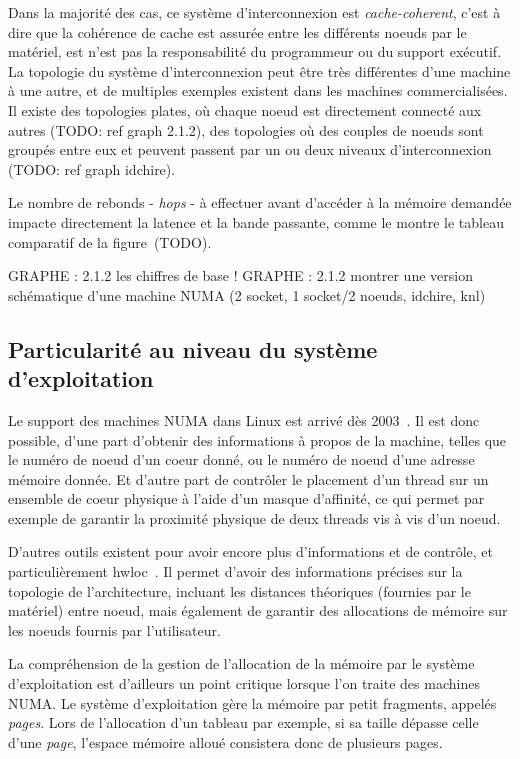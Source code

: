 Dans la majorité des cas, ce système d'interconnexion est \emph{cache-coherent}, c'est à dire que la cohérence de cache est assurée entre les différents noeuds par le matériel, est n'est pas la responsabilité du programmeur ou du support exécutif.
La topologie du système d'interconnexion peut être très différentes d'une machine à une autre, et de multiples exemples existent dans les machines commercialisées.
Il existe des topologies plates, où chaque noeud est directement connecté aux autres (TODO: ref graph 2.1.2), des topologies où des couples de noeuds sont groupés entre eux et peuvent passent par un ou deux niveaux d'interconnexion (TODO: ref graph idchire).

Le nombre de rebonds - \emph{hops} - à effectuer avant d'accéder à la mémoire demandée impacte directement la latence et la bande passante, comme le montre le tableau comparatif de la figure~(TODO).

GRAPHE : 2.1.2 les chiffres de base !
GRAPHE : 2.1.2 montrer une version schématique d'une machine NUMA (2 socket, 1 socket/2 noeuds, idchire, knl)


\subsection{Particularité au niveau du système d'exploitation}\label{sec:context:numa:os}

Le support des machines NUMA dans Linux est arrivé dès 2003~\cite{Dobson2003}.
Il est donc possible, d'une part d'obtenir des informations à propos de la machine, telles que le numéro de noeud d'un coeur donné, ou le numéro de noeud d'une adresse mémoire donnée.
Et d'autre part de contrôler le placement d'un thread sur un ensemble de coeur physique à l'aide d'un masque d'affinité, ce qui permet par exemple de garantir la proximité physique de deux threads vis à vis d'un noeud.

D'autres outils existent pour avoir encore plus d'informations et de contrôle, et particulièrement hwloc~\cite{Broquedis2010}.
Il permet d'avoir des informations précises sur la topologie de l'architecture, incluant les distances théoriques (fournies par le matériel) entre noeud, mais également de garantir des allocations de mémoire sur les noeuds fournis par l'utilisateur.

La compréhension de la gestion de l'allocation de la mémoire par le système d'exploitation est d'ailleurs un point critique lorsque l'on traite des machines NUMA.
Le système d'exploitation gère la mémoire par petit fragments, appelés \emph{pages}.
Lors de l'allocation d'un tableau par exemple, si sa taille dépasse celle d'une \emph{page}, l'espace mémoire alloué consistera donc de plusieurs pages.


